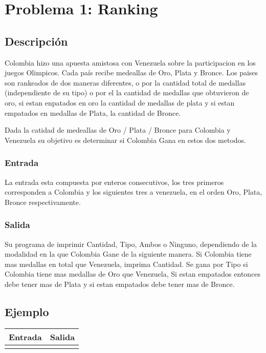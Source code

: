 \section{Problema 1: Ranking}

\subsection{Descripción}
Colombia hizo una apuesta amistosa con Venezuela sobre la participacion en los juegos Olimpicos. Cada país recibe medeallas de Oro, Plata y Bronce. Los paises son rankeados de dos maneras diferentes, o por la cantidad total de medallas (independiente de su tipo) o por el la cantidad de medallas que obtuvieron de oro, si estan enpatados en oro la cantidad de medallas de plata y si estan empatados en medallas de Plata, la cantidad de  Bronce.

Dada la catidad de medeallas de Oro / Plata / Bronce  para Colombia y Venezuela su objetivo es determinar si Colombia Gana en estos dos metodos. 

\subsubsection{Entrada}

La entrada esta compuesta por enteros consecutivos, los tres primeros corresponden a Colombia y los siguientes tres a venezuela, en el orden Oro, Plata, Bronce respectivamente.

\subsubsection{Salida}

Su programa de imprimir Cantidad, Tipo, Ambos o Ninguno, dependiendo de la modalidad en la que Colombia Gane de la siguiente manera.
Si Colombia tiene mas medallas en total que Venezuela, imprima Cantidad. Se gana por Tipo si Colombia tiene mas medallas de Oro que Venezuela, Si estan empatados entonces debe tener mas de Plata y si estan empatados debe tener mas de Bronce. 


\subsection{Ejemplo}

\begin{tabu} to \linewidth {|X[c]|X[c]|}
  \hline
  \rowfont{\bfseries\itshape\large} Entrada & Salida \\
  \hline
   &  \\
  \hline  
\end{tabu}
